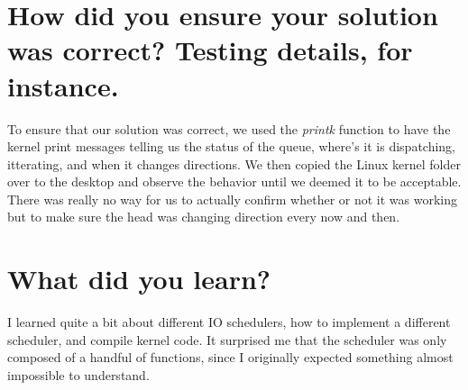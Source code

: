 \documentclass[letterpaper,10pt,notitlepage,fleqn]{article}
\begin{document}
\section*{How did you ensure your solution was correct? Testing details, for instance.}
To ensure that our solution was correct, we used the \textit{printk} function to have the kernel print messages telling us the status of the queue, where's it is dispatching, itterating, and when it changes directions. We then copied the Linux kernel folder over to the desktop and observe the behavior until we deemed it to be acceptable. There was really no way for us to actually confirm whether or not it was working but to make sure the head was changing direction every now and then.

\section*{What did you learn?}
I learned quite a bit about different IO schedulers, how to implement a different scheduler, and compile kernel code. It surprised me that the scheduler was only composed of a handful of functions, since I originally expected something almost impossible to understand.
\end{document}
